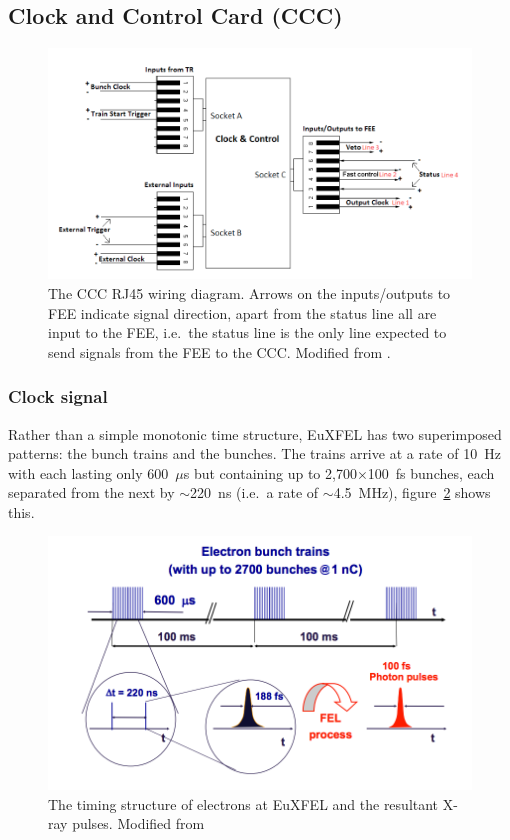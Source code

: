 \subsection{Clock and Control Card (CCC)} %
\label{sub:clock_and_control_card}
\begin{figure}[htbp]
  \centering
    \includegraphics[width=.9\textwidth]{images/Other/CCC_RJ45_diagram.png}
  \caption{The CCC RJ45 wiring diagram. Arrows on the inputs/outputs to FEE indicate signal direction, apart from the status line all are input to the FEE, i.e.\ the status line is the only line expected to send signals from the FEE to the CCC. Modified from \cite{ccc_spec}.}
  \label{fig:CCC_RJ45_diagram}
\end{figure}

\subsubsection{Clock signal} %
\label{sub:clock_signal}
Rather than a simple monotonic time structure, EuXFEL has two superimposed patterns: the bunch trains and the bunches. The trains arrive at a rate of 10~Hz with each lasting only 600~\(\mu\)s but containing up to 2,700\( \times\)100~fs bunches, each separated from the next by \(\sim\)220~ns (i.e.\ a rate of \(\sim\)4.5~MHz), figure~\ref{fig:XFEL-time_structure} shows this.
\begin{figure}[htbp]
  \centering
    \includegraphics[width=.9\textwidth]{images/Other/XFEL-time_structure.png}
  \caption{The timing structure of electrons at EuXFEL and the resultant X-ray pulses. Modified from \cite{ccc_spec}}
  \label{fig:XFEL-time_structure}
\end{figure}

